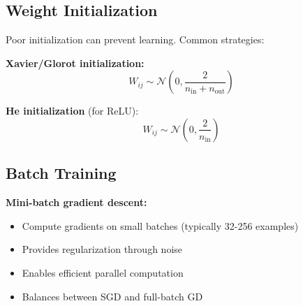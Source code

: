 \subsection{Weight Initialization}

Poor initialization can prevent learning. Common strategies:

\textbf{Xavier/Glorot initialization:}
\begin{equation}
W_{ij} \sim \mathcal{N}\left(0, \frac{2}{n_{\text{in}} + n_{\text{out}}}\right)
\end{equation}

\textbf{He initialization} (for ReLU):
\begin{equation}
W_{ij} \sim \mathcal{N}\left(0, \frac{2}{n_{\text{in}}}\right)
\end{equation}

\subsection{Batch Training}

\textbf{Mini-batch gradient descent:}
\begin{itemize}
    \item Compute gradients on small batches (typically 32-256 examples)
    \item Provides regularization through noise
    \item Enables efficient parallel computation
    \item Balances between SGD and full-batch GD
\end{itemize}

